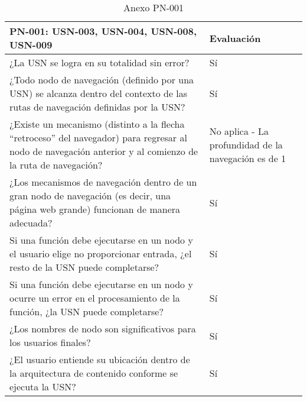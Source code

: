 \begin{table}[htpb]
\centering
\begin{tabularx}{\textwidth}{|X|X|}
\hline
\rowcolor[gray]{0.9}\textbf{PN-001: USN-003, USN-004, USN-008, USN-009}                                                                                                         & \textbf{Evaluación}                                 \\ \hline
¿La USN se logra en su totalidad sin error?                                                                                                                & Sí                                                  \\ \hline
¿Todo nodo de navegación (definido por una USN) se alcanza dentro del contexto de las rutas de navegación definidas por la USN?                            & Sí                                                  \\ \hline
¿Existe un mecanismo (distinto a la flecha ``retroceso'' del navegador) para regresar al nodo de navegación anterior y al comienzo de la ruta de navegación? & No aplica - La profundidad de la navegación es de 1 \\ \hline
¿Los mecanismos de navegación dentro de un gran nodo de navegación (es decir, una página web grande) funcionan de manera adecuada?                         & Sí                                                  \\ \hline
Si una función debe ejecutarse en un nodo y el usuario elige no proporcionar entrada, ¿el resto de la USN puede completarse?                               & Sí                                                  \\ \hline
Si una función debe ejecutarse en un nodo y ocurre un error en el procesamiento de la función, ¿la USN puede completarse?                                  & Sí                                                  \\ \hline
¿Los nombres de nodo son significativos para los usuarios finales?                                                                                         & Sí                                                  \\ \hline
¿El usuario entiende su ubicación dentro de la arquitectura de contenido conforme se ejecuta la USN?                                                       & Sí                                                  \\ \hline
\end{tabularx}
\caption{Anexo PN-001}
\end{table}


